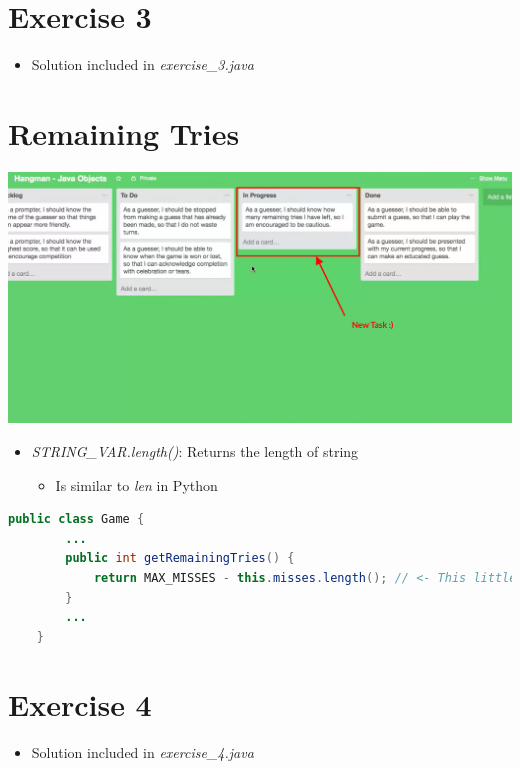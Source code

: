 \documentclass[12pt]{article}
\begin{document}
\bigskip

\section{Exercise 3}

\bigskip

\begin{itemize}
    \item Solution included in \textit{exercise\_3.java}
\end{itemize}

\bigskip

\section{Remaining Tries}

\bigskip

\begin{center}
\includegraphics[width=\linewidth]{images/part_3_notes_6.png}
\end{center}

\begin{itemize}
    \item \textit{STRING\_VAR.length()}: Returns the length of string
    \begin{itemize}
        \item Is similar to \textit{len} in Python
    \end{itemize}
\end{itemize}

    \begin{lstlisting}[language=Java,caption={lesson\_11/Game.java}]
    public class Game {
        ...
        public int getRemainingTries() {
            return MAX_MISSES - this.misses.length(); // <- This little guy here :)
        }
        ...
    }
    \end{lstlisting}

\bigskip

\section{Exercise 4}

\bigskip

\begin{itemize}
    \item Solution included in \textit{exercise\_4.java}
\end{itemize}

\bigskip
\end{document}
